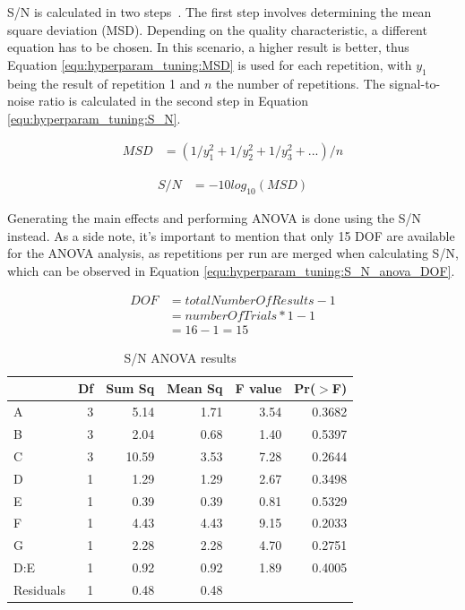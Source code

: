 S/N is calculated in two steps~\cite{roy_primer_1990}. The first step involves determining  the mean square deviation (MSD). Depending on the quality characteristic, a different equation has to be chosen. In this scenario, a higher result is better, thus Equation \ref{equ:hyperparam_tuning:MSD} is used for each repetition, with $y_1$ being the result of repetition 1 and $n$ the number of repetitions. The signal-to-noise ratio is calculated in the second step in Equation \ref{equ:hyperparam_tuning:S_N}.

\begin{equation}
	\begin{split}
		MSD & = (1/y^2_1 + 1/y^2_2 + 1/y^2_3 + ... ) / n
	\end{split}
	 \label{equ:hyperparam_tuning:MSD}
\end{equation}

\begin{equation}
	\begin{split}
		S/N & = -10 log_{10} (MSD)
	\end{split}
	 \label{equ:hyperparam_tuning:S_N}
\end{equation}

Generating the main effects and performing ANOVA is done using the S/N instead. As a side note, it's important to mention that only 15 DOF are available for the ANOVA analysis, as repetitions per run are merged when calculating S/N, which can be observed in Equation \ref{equ:hyperparam_tuning:S_N_anova_DOF}.

\begin{equation}
	\begin{split}
		DOF & = totalNumberOfResults - 1 \\
		& = numberOfTrials * 1 - 1 \\
		& = 16 - 1 = 15
	\end{split}
	 \label{equ:hyperparam_tuning:S_N_anova_DOF}
\end{equation}

\begin{table}[ht]
	\centering
	\begin{tabular}{lrrrrr}
		\hline
		& Df & Sum Sq & Mean Sq & F value & Pr($>$F) \\ 
		\hline
		A & 3 & 5.14 & 1.71 & 3.54 & 0.3682 \\ 
		B & 3 & 2.04 & 0.68 & 1.40 & 0.5397 \\ 
		C & 3 & 10.59 & 3.53 & 7.28 & 0.2644 \\ 
		D & 1 & 1.29 & 1.29 & 2.67 & 0.3498 \\ 
		E & 1 & 0.39 & 0.39 & 0.81 & 0.5329 \\ 
		F & 1 & 4.43 & 4.43 & 9.15 & 0.2033 \\ 
		G & 1 & 2.28 & 2.28 & 4.70 & 0.2751 \\ 
		D:E & 1 & 0.92 & 0.92 & 1.89 & 0.4005 \\ 
		Residuals & 1 & 0.48 & 0.48 &  &  \\ 
		\hline
	\end{tabular}
	\caption{S/N ANOVA results}
	\label{tab:hyperparameter_tuning:s_n_anova_results}
\end{table}

